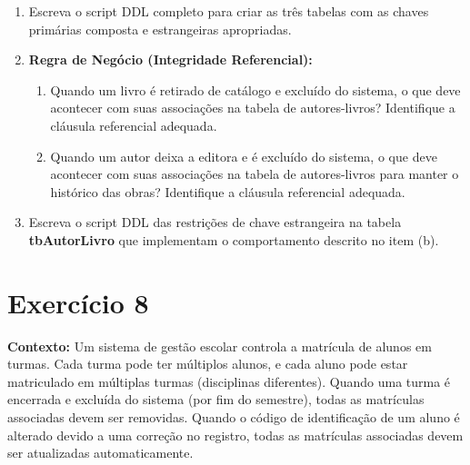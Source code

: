 \begin{enumerate}[label=\textbf{\alph*)}]
    \item Escreva o script DDL completo para criar as três tabelas com as chaves primárias composta e estrangeiras apropriadas.
    \resposta{4cm}
    
    \item \textbf{Regra de Negócio (Integridade Referencial):} 
    \begin{enumerate}[label=\arabic*.]
        \item Quando um livro é retirado de catálogo e excluído do sistema, o que deve acontecer com suas associações na tabela de autores-livros? Identifique a cláusula referencial adequada.
        \item Quando um autor deixa a editora e é excluído do sistema, o que deve acontecer com suas associações na tabela de autores-livros para manter o histórico das obras? Identifique a cláusula referencial adequada.
    \end{enumerate}
    \resposta{3cm}
    
    \item Escreva o script DDL das restrições de chave estrangeira na tabela \textbf{tbAutorLivro} que implementam o comportamento descrito no item (b).
    \resposta{3cm}
\end{enumerate}

\section*{Exercício 8}

\textbf{Contexto:} Um sistema de gestão escolar controla a matrícula de alunos em turmas. Cada turma pode ter múltiplos alunos, e cada aluno pode estar matriculado em múltiplas turmas (disciplinas diferentes). Quando uma turma é encerrada e excluída do sistema (por fim do semestre), todas as matrículas associadas devem ser removidas. Quando o código de identificação de um aluno é alterado devido a uma correção no registro, todas as matrículas associadas devem ser atualizadas automaticamente.

